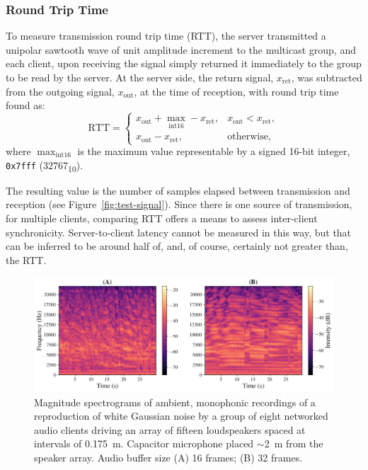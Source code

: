 \documentclass[utf8]{FrontiersinHarvard}
\newcommand{\figref}[1]{Figure~\ref{#1}}
\newcommand{\numDec}[1]{\num{#1}\textsubscript{10}}
\begin{document}
    \subsubsection{Round Trip Time}
    To measure transmission round trip time (RTT), the server transmitted a unipolar
    sawtooth wave of unit amplitude increment to the multicast group, and each
    client, upon receiving the signal simply returned it immediately to the group to
    be read by the server.
    At the server side, the return signal, $x_{\text{ret}}$, was subtracted from the
    outgoing signal, $x_{\text{out}}$, at the time of reception, with round trip
    time found as:
    \begin{equation}
        \label{eq:rtt}
        \text{RTT} = \begin{cases}
                         x_{\text{out}} + \max_{\text{int16}} - x_{\text{ret}}, &x_{\text{out}} < x_{\text{ret}}, \\
                         x_{\text{out}} - x_{\text{ret}}, &\text{otherwise},
        \end{cases}
    \end{equation}
    where $\max_{\text{int16}}$ is the maximum value representable by a
    signed 16-bit integer, \texttt{0x7fff} (\numDec{32767}).

    The resulting value is the number of samples elapsed between transmission and
    reception (see \figref{fig:test-signal}).
    Since there is one source of transmission, for multiple clients, comparing RTT
    offers a means to assess inter-client synchronicity.
    Server-to-client latency cannot be measured in this way, but that can be
    inferred to be around half of, and, of course, certainly not greater than, the
    RTT.\

    \begin{figure}[h]
        \centering
        \includegraphics[width=\textwidth]{figures/wgn_specgram_16_32}
        \caption{
            Magnitude spectrograms of ambient, monophonic recordings of a
            reproduction of white Gaussian noise by a group of eight networked
            audio clients driving an array of fifteen loudspeakers spaced at
            intervals of \qty{.175}{\m}.
            Capacitor microphone placed $\sim$\qty{2}{\m} from the
            speaker array.
            Audio buffer size (A) 16 frames; (B) 32 frames.
        }
        \label{fig:spectrograms}
    \end{figure}
\end{document}
